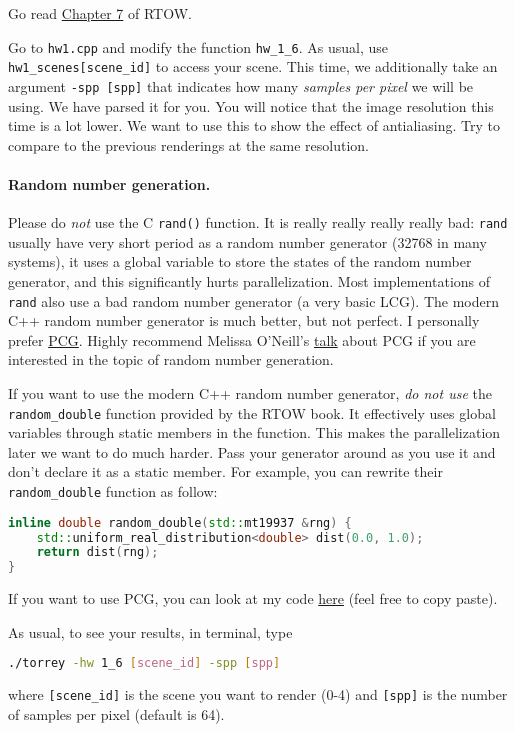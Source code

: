 Go read \href{https://raytracing.github.io/books/RayTracingInOneWeekend.html#antialiasing}{Chapter 7} of RTOW.

Go to \lstinline{hw1.cpp} and modify the function \lstinline{hw_1_6}. As usual, use \lstinline{hw1_scenes[scene_id]} to access your scene. This time, we additionally take an argument \lstinline{-spp [spp]} that indicates how many \emph{samples per pixel} we will be using. We have parsed it for you. You will notice that the image resolution this time is a lot lower. We want to use this to show the effect of antialiasing. Try to compare to the previous renderings at the same resolution.

\paragraph{Random number generation.} Please do \emph{not} use the C \lstinline{rand()} function. It is really really really really bad: \lstinline{rand} usually have very short period as a random number generator (32768 in many systems), it uses a global variable to store the states of the random number generator, and this significantly hurts parallelization. Most implementations of \lstinline{rand} also use a bad random number generator (a very basic LCG). The modern C++ random number generator is much better, but not perfect. I personally prefer \href{https://www.pcg-random.org/}{PCG}. Highly recommend Melissa O'Neill's \href{https://www.youtube.com/watch?v=45Oet5qjlms}{talk} about PCG if you are interested in the topic of random number generation.

If you want to use the modern C++ random number generator, \emph{do not use} the \lstinline{random_double} function provided by the RTOW book. It effectively uses global variables through static members in the function. This makes the parallelization later we want to do much harder. Pass your generator around as you use it and don't declare it as a static member. For example, you can rewrite their \lstinline{random_double} function as follow:
\begin{lstlisting}[language=C++]
inline double random_double(std::mt19937 &rng) {
    std::uniform_real_distribution<double> dist(0.0, 1.0);
    return dist(rng);
}
\end{lstlisting}
If you want to use PCG, you can look at my code \href{https://github.com/BachiLi/lajolla_public/src/pcg.h}{here} (feel free to copy paste).

As usual, to see your results, in terminal, type
\begin{lstlisting}[language=bash]
  ./torrey -hw 1_6 [scene_id] -spp [spp]
\end{lstlisting}
where \lstinline{[scene_id]} is the scene you want to render (0-4) and \lstinline{[spp]} is the number of samples per pixel (default is 64).

